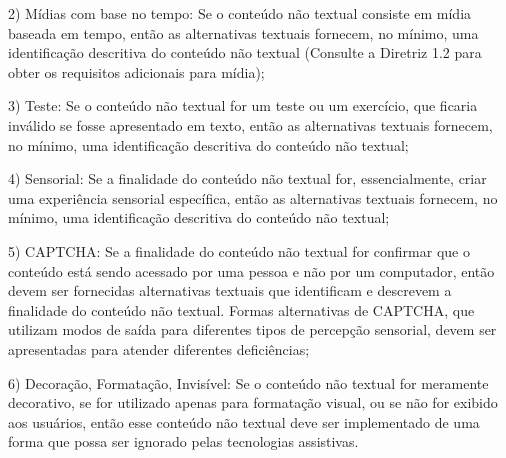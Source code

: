 \documentclass[a4paper]{article}
\begin{document}
\begin{titlepage}
\hspace{.1\textwidth} %
\begin{minipage}{.85\textwidth}
	2) Mídias com base no tempo: Se o conteúdo não textual consiste em mídia baseada em tempo, então as alternativas textuais fornecem, no mínimo, uma identificação descritiva do conteúdo não textual (Consulte a Diretriz 1.2 para obter os requisitos adicionais para mídia);\\
\end{minipage}

\hspace{.1\textwidth} %
\begin{minipage}{.85\textwidth}
	3) Teste: Se o conteúdo não textual for um teste ou um exercício, que ficaria inválido se fosse apresentado em texto, então as alternativas textuais fornecem, no mínimo, uma identificação descritiva do conteúdo não textual;\\
\end{minipage}

\hspace{.1\textwidth} %
\begin{minipage}{.85\textwidth}
	4) Sensorial: Se a finalidade do conteúdo não textual for, essencialmente, criar uma experiência sensorial específica, então as alternativas textuais fornecem, no mínimo, uma identificação descritiva do conteúdo não textual;\\
\end{minipage}

\hspace{.1\textwidth} %
\begin{minipage}{.85\textwidth}
	5) CAPTCHA: Se a finalidade do conteúdo não textual for confirmar que o conteúdo está sendo acessado por uma pessoa e não por um computador, então devem ser fornecidas alternativas textuais que identificam e descrevem a finalidade do conteúdo não textual. Formas alternativas de CAPTCHA, que utilizam modos de saída para diferentes tipos de percepção sensorial, devem ser apresentadas para atender diferentes deficiências;\\
\end{minipage}

\hspace{.1\textwidth} %
\begin{minipage}{.85\textwidth}
	6) Decoração, Formatação, Invisível: Se o conteúdo não textual for meramente decorativo, se for utilizado apenas para formatação visual, ou se não for exibido aos usuários, então esse conteúdo não textual deve ser implementado de uma forma que possa ser ignorado pelas tecnologias assistivas.\\
\end{minipage}


\end{titlepage}
\end{document}
